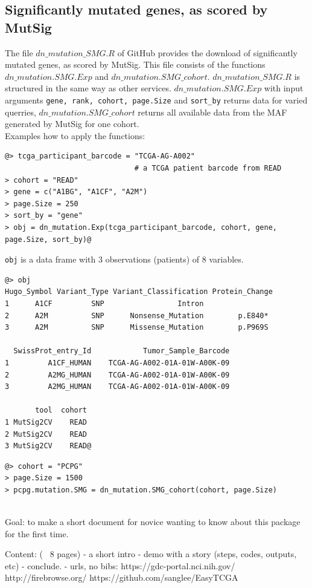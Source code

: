 \documentclass[a4paper,12pt,listof=totoc,bibliography=totoc]{scrartcl}
\begin{document}
\subsection{Significantly mutated genes, as scored by MutSig}
The file $dn\_mutation\_SMG.R$ of GitHub provides the download of significantly mutated genes, as scored by MutSig. This file consists of the functions 
$dn\_mutation.SMG.Exp$ and $dn\_mutation.SMG\_cohort$. $dn\_mutation\_SMG.R$ is structured in the same way as other services.
$dn\_mutation.SMG.Exp$ with input arguments {\tt gene, rank, cohort, page.Size} and {\tt sort\_by} returns data for varied querries,
$dn\_mutation.SMG\_cohort$ returns all available data from the MAF generated by MutSig for one cohort.\\
Examples how to apply the functions:
\begin{lstlisting}[style=base]
@> tcga_participant_barcode = "TCGA-AG-A002" 
                              # a TCGA patient barcode from READ
> cohort = "READ"
> gene = c("A1BG", "A1CF", "A2M")
> page.Size = 250
> sort_by = "gene"
> obj = dn_mutation.Exp(tcga_participant_barcode, cohort, gene, 
page.Size, sort_by)@
\end{lstlisting}
{\tt obj} is a data frame with 3 observations (patients) of 8 variables.
\begin{lstlisting}[style=base]
@> obj
Hugo_Symbol Variant_Type Variant_Classification Protein_Change 
1      A1CF         SNP                 Intron                        
2      A2M          SNP      Nonsense_Mutation        p.E840*         
3      A2M          SNP      Missense_Mutation        p.P969S    

  SwissProt_entry_Id            Tumor_Sample_Barcode       
1         A1CF_HUMAN    TCGA-AG-A002-01A-01W-A00K-09    
2         A2MG_HUMAN    TCGA-AG-A002-01A-01W-A00K-09     
3         A2MG_HUMAN    TCGA-AG-A002-01A-01W-A00K-09     

       tool  cohort
1 MutSig2CV    READ
2 MutSig2CV    READ
3 MutSig2CV    READ@
\end{lstlisting}



\begin{lstlisting}[style=base]
@> cohort = "PCPG"
> page.Size = 1500
> pcpg.mutation.SMG = dn_mutation.SMG_cohort(cohort, page.Size)
\end{lstlisting}



\ \\


Goal: to make a short document for novice wanting to know about this
package for the first time.

Content: (~ 8 pages)
- a short intro
- demo with a story (steps, codes, outputs, etc)
- conclude.
- urls, no bibs:
  https://gdc-portal.nci.nih.gov/
  http://firebrowse.org/
  https://github.com/sanglee/EasyTCGA

\end{document}
